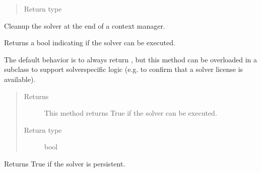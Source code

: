 \documentclass[letterpaper,10pt,english]{sphinxmanual}
\begin{document}
\begin{fulllineitems}
\begin{fulllineitems}
\begin{quote}
\begin{description}
\item[{Return type}] \leavevmode
{\hyperref[\detokenize{reference/solverapi:pao.common.solver.SolverAPI}]{}}

\end{description}\end{quote}

\end{fulllineitems}


\begin{fulllineitems}
\label{\detokenize{reference/solverapi:pao.common.solver.SolverAPI.__exit__}}
Cleanup the solver at the end of a context manager.

\end{fulllineitems}


\begin{fulllineitems}
\label{\detokenize{reference/solverapi:pao.common.solver.SolverAPI.available}}
Returns a bool indicating if the solver can be executed.

The default behavior is to always return , but this method
can be overloaded in a subclass to support solver\sphinxhyphen{}specific logic
(e.g.  to confirm that a solver license is available).
\begin{quote}\begin{description}
\item[{Returns}] \leavevmode
This method returns True if the solver can be executed.

\item[{Return type}] \leavevmode
bool

\end{description}\end{quote}

\end{fulllineitems}


\begin{fulllineitems}
\label{\detokenize{reference/solverapi:pao.common.solver.SolverAPI.is_persistent}}
Returns True if the solver is persistent.


\end{fulllineitems}
\end{fulllineitems}
\end{document}
